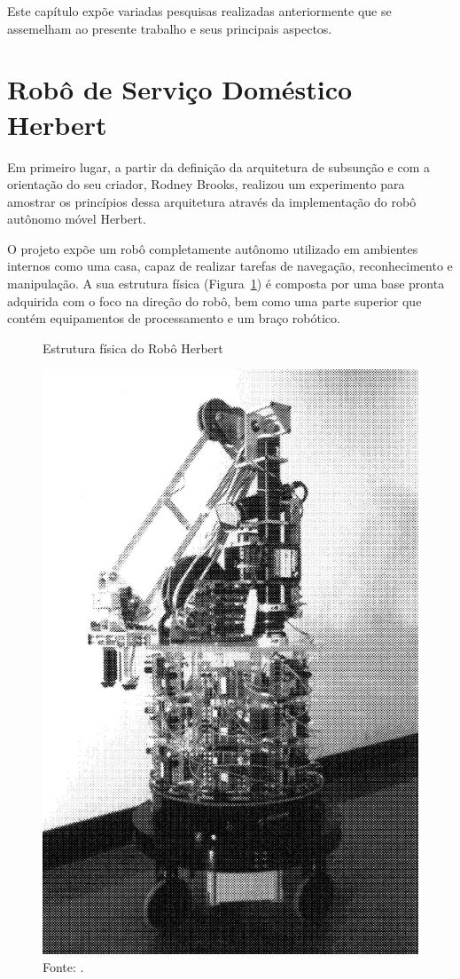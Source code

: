 Este capítulo expõe variadas pesquisas realizadas anteriormente que se assemelham ao presente trabalho e seus principais aspectos.

\section{Robô de Serviço Doméstico Herbert}
Em primeiro lugar, a partir da definição da arquitetura de subsunção e com a orientação do seu criador, Rodney Brooks, \citet{herbert:1988} realizou um experimento para amostrar os princípios dessa arquitetura através da implementação do robô autônomo móvel Herbert.  

O projeto \citet{herbert:1988}  expõe um robô completamente autônomo utilizado em ambientes internos como uma casa, capaz de realizar tarefas de navegação, reconhecimento e manipulação. A sua estrutura física (Figura~\ref{fig:herbert})  é composta por uma base pronta adquirida com o foco na direção do robô, bem como uma parte superior que contém equipamentos de processamento e um braço robótico. 

\begin{figure}[H]
    \centering
    \caption{Estrutura física do Robô Herbert}
    \includegraphics[scale=0.2]{herbert.png}
    \caption*{Fonte: \citet{herbert:1988}.}
    \label{fig:herbert}
\end{figure}

